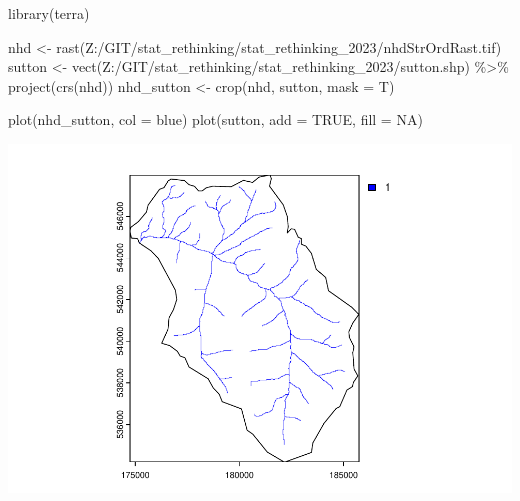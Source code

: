 \documentclass[
]{book}
\newenvironment{Shaded}{\begin{snugshade}}{\end{snugshade}}
\newcommand{\AttributeTok}[1]{\textcolor[rgb]{0.77,0.63,0.00}{#1}}
\newcommand{\ConstantTok}[1]{\textcolor[rgb]{0.00,0.00,0.00}{#1}}
\newcommand{\DecValTok}[1]{\textcolor[rgb]{0.00,0.00,0.81}{#1}}
\newcommand{\DocumentationTok}[1]{\textcolor[rgb]{0.56,0.35,0.01}{\textbf{\textit{#1}}}}
\newcommand{\FunctionTok}[1]{\textcolor[rgb]{0.00,0.00,0.00}{#1}}
\newcommand{\NormalTok}[1]{#1}
\newcommand{\OtherTok}[1]{\textcolor[rgb]{0.56,0.35,0.01}{#1}}
\newcommand{\SpecialCharTok}[1]{\textcolor[rgb]{0.00,0.00,0.00}{#1}}
\newcommand{\StringTok}[1]{\textcolor[rgb]{0.31,0.60,0.02}{#1}}
\begin{document}
\begin{Shaded}
\begin{Highlighting}[]
\FunctionTok{library}\NormalTok{(terra)}

\NormalTok{nhd }\OtherTok{\textless{}{-}} \FunctionTok{rast}\NormalTok{(}\StringTok{\textquotesingle{}Z:/GIT/stat\_rethinking/stat\_rethinking\_2023/nhdStrOrdRast.tif\textquotesingle{}}\NormalTok{)}
\NormalTok{sutton }\OtherTok{\textless{}{-}} \FunctionTok{vect}\NormalTok{(}\StringTok{\textquotesingle{}Z:/GIT/stat\_rethinking/stat\_rethinking\_2023/sutton.shp\textquotesingle{}}\NormalTok{) }\SpecialCharTok{\%\textgreater{}\%} \FunctionTok{project}\NormalTok{(}\FunctionTok{crs}\NormalTok{(nhd))}
\NormalTok{nhd\_sutton }\OtherTok{\textless{}{-}} \FunctionTok{crop}\NormalTok{(nhd, sutton, }\AttributeTok{mask =}\NormalTok{ T)}

\FunctionTok{plot}\NormalTok{(nhd\_sutton, }\AttributeTok{col =} \StringTok{\textquotesingle{}blue\textquotesingle{}}\NormalTok{)}
\FunctionTok{plot}\NormalTok{(sutton, }\AttributeTok{add =} \ConstantTok{TRUE}\NormalTok{, }\AttributeTok{fill =} \ConstantTok{NA}\NormalTok{)}
\end{Highlighting}
\end{Shaded}

\includegraphics{bookdown-demo_files/figure-latex/unnamed-chunk-1-1.pdf}

\begin{Shaded}
\end{Shaded}
\end{document}
